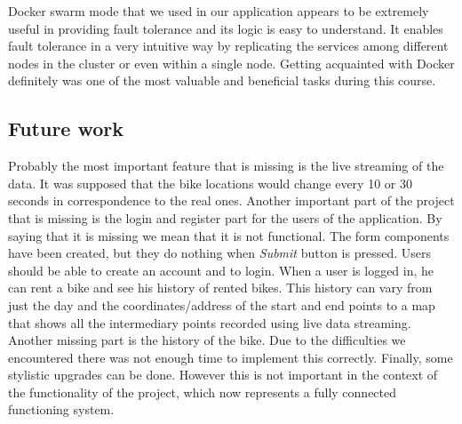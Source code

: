 Docker swarm mode that we used in our application appears to be extremely useful in providing fault tolerance and its logic is easy to understand. It enables fault tolerance in a very intuitive way by replicating the services among different nodes in the cluster or even within a single node. Getting acquainted with Docker definitely was one of the most valuable and beneficial tasks during this course.

\subsection{Future work}
Probably the most important feature that is missing is the live streaming of the data. It was supposed that the bike locations would change every 10 or 30 seconds in correspondence to the real ones. Another important part of the project that is missing is the login and register part for the users of the application. By saying that it is missing we mean that it is not functional. The form components have been created, but they do nothing when \textit{Submit} button is pressed. Users should be able to create an account and to login. When a user is logged in, he can rent a bike and see his history of rented bikes. This history can vary from just the day and the coordinates/address of the start and end points to a map that shows all the intermediary points recorded using live data streaming. Another missing part is the history of the bike. Due to the difficulties we encountered there was not enough time to implement this correctly. Finally, some stylistic upgrades can be done. However this is not important in the context of the functionality of the project, which now represents a fully connected functioning system.
